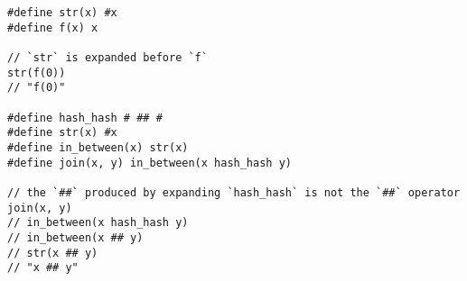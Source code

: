 \begin{lstlisting}[style=c]
#define str(x) #x
#define f(x) x

// `str` is expanded before `f`
str(f(0))
// "f(0)"

#define hash_hash # ## #
#define str(x) #x
#define in_between(x) str(x)
#define join(x, y) in_between(x hash_hash y)

// the `##` produced by expanding `hash_hash` is not the `##` operator
join(x, y)
// in_between(x hash_hash y)
// in_between(x ## y)
// str(x ## y)
// "x ## y"
\end{lstlisting}
